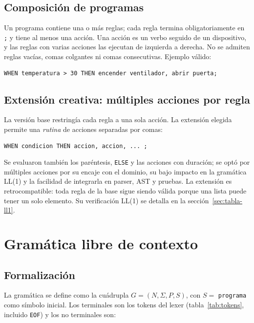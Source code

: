 \documentclass[12pt,a4paper]{article}
\begin{document}
\subsection{Composición de programas}
Un programa contiene una o más reglas; cada regla termina obligatoriamente en
\texttt{;} y tiene al menos una acción. Una acción es un verbo seguido de un
dispositivo, y las reglas con varias acciones las ejecutan de izquierda a
derecha. No se admiten reglas vacías, comas colgantes ni comas consecutivas.
Ejemplo válido:

\begin{lstlisting}
WHEN temperatura > 30 THEN encender ventilador, abrir puerta;
\end{lstlisting}

\subsection{Extensión creativa: múltiples acciones por regla}
La versión base restringía cada regla a una sola acción. La extensión elegida
permite una \emph{rutina} de acciones separadas por comas:

\begin{lstlisting}
WHEN condicion THEN accion, accion, ... ;
\end{lstlisting}

Se evaluaron también los paréntesis, \texttt{ELSE} y las acciones con
duración; se optó por múltiples acciones por su encaje con el dominio, su
bajo impacto en la gramática LL(1) y la facilidad de integrarla en parser,
AST y pruebas. La extensión es retrocompatible: toda regla de la base sigue
siendo válida porque una lista puede tener un solo elemento. Su verificación
LL(1) se detalla en la sección~\ref{sec:tabla-ll1}.

\section{Gramática libre de contexto}

\subsection{Formalización}
La gramática se define como la cuádrupla
$G = (N, \Sigma, P, S)$, con $S = $ \texttt{programa} como símbolo inicial.
Los terminales son los tokens del lexer (tabla~\ref{tab:tokens}, incluido
\texttt{EOF}) y los no terminales son:
\end{document}
